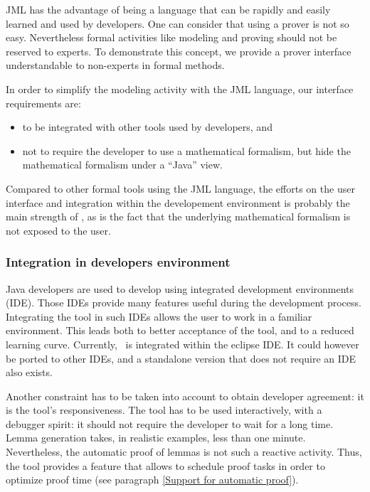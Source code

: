 \label{Industrialisation}
JML has the advantage of being a language that can be rapidly and
easily learned and used by developers. One can consider that using a
prover is not so easy. Nevertheless formal activities like modeling
and proving should not be reserved to experts. To demonstrate this
concept, we provide a prover interface understandable to non-experts
in formal methods.

In order to simplify the modeling activity with the JML language, our
interface requirements are:
\begin{itemize}
 \item to be integrated with other tools used by developers, and
 \item not to require the developer to use a mathematical formalism,
    but hide the mathematical formalism under a ``Java'' view.
\end{itemize}
Compared to other formal tools using the JML language, the efforts on
the user interface and integration within the developement
environment is probably the main strength of \JACK, as is the fact
that the underlying mathematical formalism is not exposed to the
user.
\subsubsection{Integration in developers environment}
 Java developers are used to develop using integrated development
environments (IDE).  Those IDEs provide many features useful during
the development process.  Integrating the tool in such IDEs allows the
user to work in a familiar environment.  This leads both to better
acceptance of the tool, and to a reduced learning curve.  Currently,
\JACK\ is integrated within the eclipse IDE.  It could however be ported
to other IDEs, and a standalone version that does not require an IDE
also exists.

 Another constraint has to be taken into account to obtain developer
 agreement: it is the tool's responsiveness.  The tool has to be used interactively, with a
 debugger spirit: it should not require the developer to wait for a
 long time.  Lemma generation takes, in realistic examples, less
 than one minute. %
 Nevertheless, the automatic proof of lemmas is not such a  reactive
 activity. Thus, the tool provides a feature that allows to schedule proof
 tasks in order to optimize proof time (see paragraph \ref{Support for
 automatic proof}).


